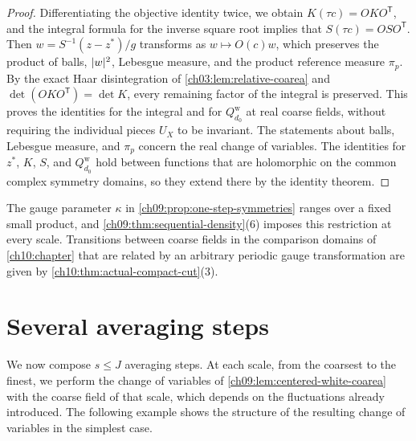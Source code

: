 \begin{proof}
Differentiating the objective identity twice, we obtain $K(\tau c)=OKO^{\mathsf T}$, and the integral formula for the inverse square root implies that $S(\tau c)=OSO^{\mathsf T}$. Then $w=S^{-1}(z-z^*)/g$ transforms as $w\mapsto O(c)w$, which preserves the product of balls, $\lvert w\rvert^2$, Lebesgue measure, and the product reference measure $\pi_p$. By the exact Haar disintegration of \cref{ch03:lem:relative-coarea} and $\det(OKO^{\mathsf T})=\det K$, every remaining factor of the integral is preserved. This proves the identities for the integral and for $Q_{d_0}^{\mathrm w}$ at real coarse fields, without requiring the individual pieces $U_X$ to be invariant. The statements about balls, Lebesgue measure, and $\pi_p$ concern the real change of variables. The identities for $z^*$, $K$, $S$, and $Q_{d_0}^{\mathrm w}$ hold between functions that are holomorphic on the common complex symmetry domains, so they extend there by the identity theorem.
\end{proof}

The gauge parameter $\kappa$ in \cref{ch09:prop:one-step-symmetries} ranges over a fixed small product, and \cref{ch09:thm:sequential-density}(6) imposes this restriction at every scale. Transitions between coarse fields in the comparison domains of \cref{ch10:chapter} that are related by an arbitrary periodic gauge transformation are given by \cref{ch10:thm:actual-compact-cut}(3).

\section{Several averaging steps}\label{ch09:sec:sequential}

We now compose $s\le J$ averaging steps. At each scale, from the coarsest to the finest, we perform the change of variables of \cref{ch09:lem:centered-white-coarea} with the coarse field of that scale, which depends on the fluctuations already introduced. The following example shows the structure of the resulting change of variables in the simplest case.

